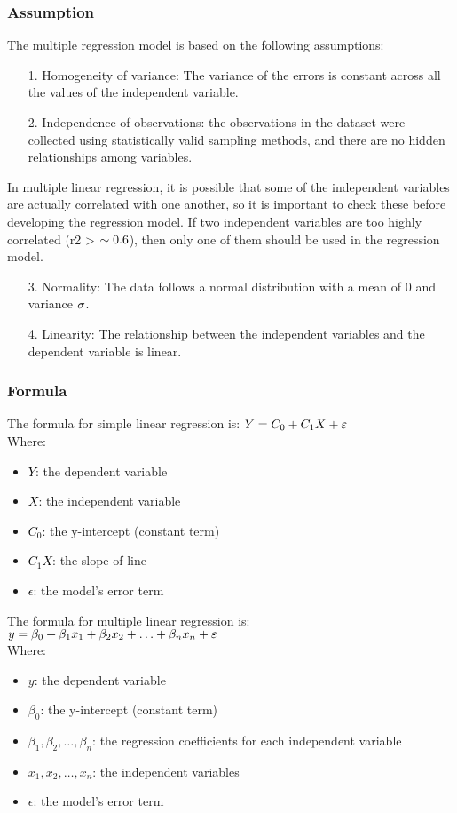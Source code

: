 \documentclass[a4paper]{article}
\begin{document}
	\subsubsection{Assumption}
	The multiple regression model is based on the following assumptions:
	\begin{itemize}
		\item[1.]Homogeneity of variance: The variance of the errors is constant across all the values of the independent variable.
		\item[2.]Independence of observations: the observations in the dataset were collected using statistically valid sampling methods, and there are no hidden relationships among variables.
	\end{itemize}
	In multiple linear regression, it is possible that some of the independent variables are actually correlated with one another, so it is important to check these before developing the regression model. If two independent variables are too highly correlated (r2 > $\textcolor{black}{\sim 0.6}$), then only one of them should be used in the regression model.
	\begin{itemize}
		\item[3.]Normality: The data follows a normal distribution with a mean of 0 and variance $\textcolor{black}{\sigma}$.
		\item[4.]Linearity: The relationship between the independent variables and the dependent variable is linear.
	\end{itemize}
	\subsubsection{Formula}
	The formula for simple linear regression is:
	$\textcolor{black}{\\Y = C_0 + C_1X + \varepsilon}$\\
	Where: 
	\begin{itemize}
		\item \textcolor{black}{\( Y \)}: the dependent variable
		\item \textcolor{black}{\( X \)}: the independent variable
		\item \textcolor{black}{\( C_0 \)}: the y-intercept (constant term)
		\item \textcolor{black}{\( C_{1}X \)}: the slope of line
		\item \textcolor{black}{\( \epsilon \)}: the model's error term
	\end{itemize}
	The formula for multiple linear regression is: $\textcolor{black}{y = \beta_0 + \beta_1 x_1 + \beta_2 x_2 + \ldots + \beta_n x_n + \varepsilon}$\\
	Where: 
	\begin{itemize}
		\item \( y \): the dependent variable
		\item \( \beta_0 \): the y-intercept (constant term)
		\item \( \beta_1, \beta_2, \ldots, \beta_n \): the regression coefficients for each independent variable
		\item \( x_1, x_2, \ldots, x_n \): the independent variables
		\item \( \epsilon \): the model's error term
	\end{itemize}
\end{document}
